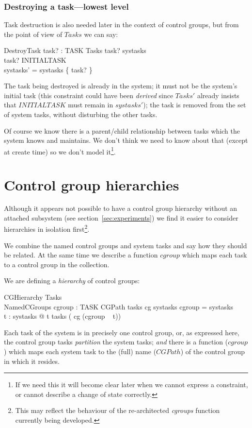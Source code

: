 \documentclass[a4paper,twoside,12pt]{article}
\begin{document}
\subsubsection{Destroying a task---lowest level}

Task destruction is also needed later in the context of control groups, but from the point of view of $Tasks$ we can say:

\begin{schema}{DestroyTask}
task? : TASK
\also
\Delta Tasks
\where
task? \in systasks \\
task? \neq INITIALTASK \\
systasks'  = systasks \setminus \{ task? \}
\end{schema}
The task being destroyed is already in the system; it must not be the system's initial task
(this constraint could have been \emph{derived} since $Tasks'$ already insists that $INITIALTASK$
must remain in $systasks'$);
the task is removed from the set of system tasks, without disturbing the other tasks.

Of course we know there is a parent/child relationship between tasks which the system knows and maintains.
We don't think we need to know about that (except at create time) so we don't model
it\footnote{If we need this it will become clear later when we cannot express a constraint,
or cannot describe a change of state correctly.}.

\section{Control group hierarchies}

Although it appears not possible to have a control group hierarchy without an attached subsystem
(see section~\ref{sec:experiments}) we find it easier to consider hierarchies in isolation 
first\footnote{This may reflect the behaviour of the re-architected \emph{cgroups} function currently being developed.}.

We combine the named control groups and system tasks and say how they should be related.
At the same time we describe a function $cgroup$ which maps each task to a control group in the collection.

We are defining a \emph{hierarchy} of control groups:

\begin{schema}{CGHierarchy}
Tasks \\
NamedCGroups
\also
cgroup : TASK \ffun CGPath
\where
tasks \circ cg \partition systasks
\also
\dom cgroup = systasks \\
\forall t : systasks @ t \in tasks ( cg (cgroup ~ t))
\end{schema}
Each task of the system is in precisely one control group, or, as expressed here,
the control group tasks \emph{partition} the system tasks;
\emph{and} there is a function ($cgroup$) which maps each system task to the (full) name
($CGPath$) of the control group in which it resides.
\end{document}
